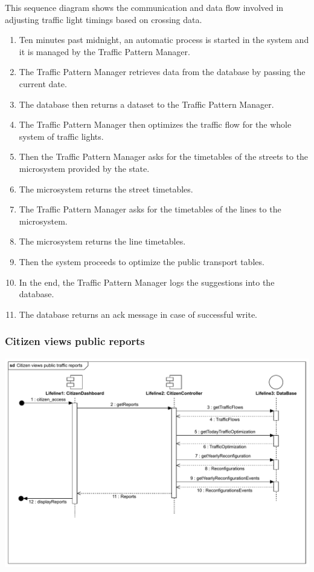 \documentclass[12pt, a4paper, twoside, openright]{report}
\begin{document}
This sequence diagram shows the communication and data flow involved in
adjusting traffic light timings based on crossing data.
\begin{enumerate}
  \item Ten minutes past midnight, an automatic process is started in the system and it is managed by the Traffic Pattern Manager.
  \item The Traffic Pattern Manager retrieves data from the database by passing the current date.
  \item	The database then returns a dataset to the Traffic Pattern Manager.
  \item	The Traffic Pattern Manager then optimizes the traffic flow for the whole system of traffic lights.
  \item	Then the Traffic Pattern Manager asks for the timetables of the streets to the microsystem provided by the state.
  \item	The microsystem returns the street timetables.
  \item	The Traffic Pattern Manager asks for the timetables of the lines to the microsystem.
  \item	The microsystem returns the line timetables.
  \item	Then the system proceeds to optimize the public transport tables.
  \item	In the end, the Traffic Pattern Manager logs the suggestions into the database.
  \item	The database returns an ack message in case of successful write.
\end{enumerate}


\subsubsection{Citizen views public reports}


\includegraphics[width=\linewidth]{images/svg/citizen_views_public_traffic_reports.pdf}
\end{document}
